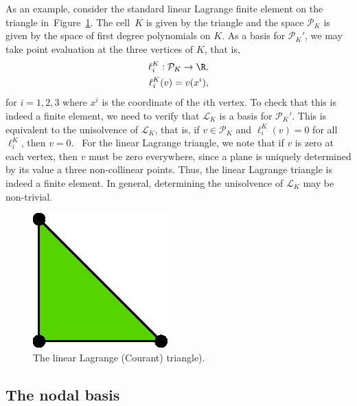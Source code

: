 As an example, consider the standard linear Lagrange finite element on
the triangle in~Figure~\ref{fig:P1}. The cell~$K$ is given by the
triangle and the space $\mathcal{P}_K$ is given by the space of first
degree polynomials on $K$. As a basis for $\mathcal{P}_K'$, we may
take point evaluation at the three vertices of $K$, that is,
\begin{displaymath}
  \begin{split}
    \ell^K_i : \mathcal{P}_K \rightarrow \R, \\
    \ell^K_i(v) = v(x^i),
  \end{split}
\end{displaymath}
for $i=1,2,3$ where $x^i$ is the coordinate of the $i$th vertex. To
check that this is indeed a finite element, we need to verify that
$\mathcal{L}_K$ is a basis for $\mathcal{P}_K'$. This is equivalent to
the unisolvence of $\mathcal{L}_K$, that is, if $v\in\mathcal{P}_K$
and $\ell^K_i(v) = 0$ for all $\ell^K_i$, then $v =
0$.~\cite{BrennerScott2008} For the linear Lagrange triangle, we note
that if $v$ is zero at each vertex, then $v$ must be zero everywhere,
since a plane is uniquely determined by its value a three
non-collinear points. Thus, the linear Lagrange triangle is indeed a
finite element.  In general, determining the unisolvence of
$\mathcal{L}_K$ may be non-trivial.

\begin{figure}
  \begin{center}
    \includegraphics[width=\smallwidth]{chapters/kirby-7/eps/P1.eps}
    \caption{The linear Lagrange (Courant) triangle).}
    \label{fig:P1}
  \end{center}
\end{figure}

\subsection{The nodal basis}

